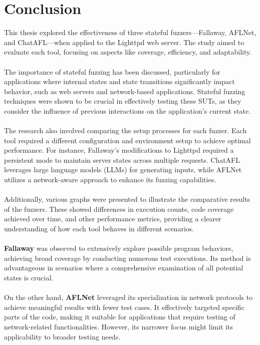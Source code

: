 \chapter{Conclusion} 
\label{chap:Conclusion}
This thesis explored the effectiveness of three stateful fuzzers—Fallaway, AFLNet, and ChatAFL—when applied to the Lighttpd web server. The study aimed to evaluate each tool, focusing on aspects like coverage, efficiency, and adaptability.
\\\\The importance of stateful fuzzing has been discussed, particularly for applications where internal states and state transitions significantly impact behavior, such as web servers and network-based applications. Stateful fuzzing techniques were shown to be crucial in effectively testing these SUTs, as they consider the influence of previous interactions on the application's current state.
\\\\The research also involved comparing the setup processes for each fuzzer. Each tool required a different configuration and environment setup to achieve optimal performance. For instance, Fallaway's modifications to Lighttpd required a persistent mode to maintain server states across multiple requests. ChatAFL leverages large language models (LLMs) for generating inputs, while AFLNet utilizes a network-aware approach to enhance its fuzzing capabilities.
\\\\Additionally, various graphs were presented to illustrate the comparative results of the fuzzers. These showed differences in execution counts, code coverage achieved over time, and other performance metrics, providing a clearer understanding of how each tool behaves in different scenarios. 
\\\\\textbf{Fallaway} was observed to extensively explore possible program behaviors, achieving broad coverage by conducting numerous test executions. Its method is advantageous in scenarios where a comprehensive examination of all potential states is crucial.
\\\\On the other hand, \textbf{AFLNet} leveraged its specialization in network protocols to achieve meaningful results with fewer test cases. It effectively targeted specific parts of the code, making it suitable for applications that require testing of network-related functionalities. However, its narrower focus might limit its applicability to broader testing needs.
